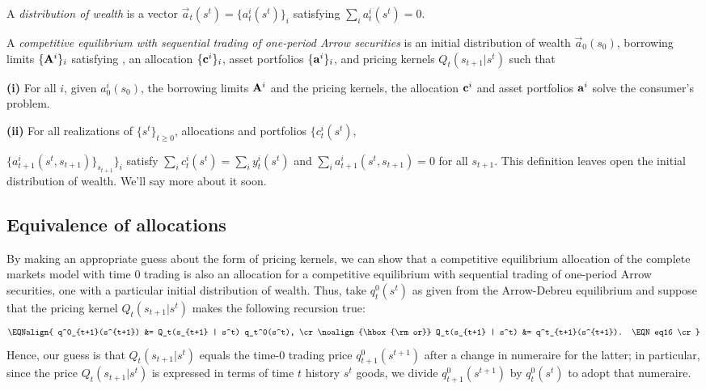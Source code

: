  \medskip
{}  A {\it distribution of wealth} is
a vector $\vec {a}_t(s^t) = \{a_t^i(s^t)\}_i$ satisfying
$\sum_i a_t^i(s^t) = 0$.
\medskip


 A {\it competitive equilibrium with sequential trading of one-period Arrow securities} is
an initial distribution of wealth $\vec { a}_0(s_0)$, 
borrowing limits $\{{\bf A}^i\}_i$ satisfying 
, 
an allocation $\{{\bf c}^i\}_i$, asset portfolios 
$\{{\bf a}^i\}_i$, and pricing
kernels $Q_t(s_{t+1} | s^t)$ such that

\medskip
\noindent
{\bf (i)} For all $i$,
given $ a^i_0(s_0)$, the borrowing 
limits ${\bf A}^i$ and the pricing kernels, 
the allocation ${\bf c}^i$ and asset portfolios
${\bf a}^i$ solve the consumer's problem.

\medskip
\noindent
{\bf (ii)} For all realizations of $\{s^t\}_{t\geq0}$,
allocations and   portfolios
$\{c^i_t(s^t), $

\noindent
$\{a^i_{t+1}(s^t, s_{t+1})\}_{s_{t+1}}\}_i$
satisfy
$\sum_i c^i_t(s^t) = \sum_i y_t^i(s^t)$ and
$\sum_i a_{t+1}^i(s^t, s_{t+1}) = 0$ 
for all $s_{t+1}$.
\medskip
\noindent This definition leaves open the initial
distribution of wealth. We'll say more about it  soon.  %


\subsection{Equivalence of allocations}
By making an appropriate guess about the form of  pricing
kernels, we can show that a competitive equilibrium
allocation of the complete markets model with time $0$ trading is
also an allocation for a competitive equilibrium with sequential trading of one-period
Arrow securities, one
with a particular initial distribution of wealth.  Thus, take
$q_t^0(s^t)$ as given from the Arrow-Debreu equilibrium and
suppose that the pricing kernel $Q_t(s_{t+1} | s^t)$ makes
the following recursion true:
$$\EQNalign{
 q^0_{t+1}(s^{t+1}) &= Q_t(s_{t+1} | s^t) q_t^0(s^t), \cr
\noalign{\hbox{\rm or}}
 Q_t(s_{t+1} | s^t) &= q^t_{t+1}(s^{t+1}).       \EQN eq16 \cr}
$$
Hence, our guess is 
that $Q_t(s_{t+1} | s^t)$ equals
the time-0 trading price $q^0_{t+1}(s^{t+1})$ after
a change in numeraire for the latter; in particular, 
since the price $Q_t(s_{t+1} | s^t)$ 
is expressed in terms of time $t$ history $s^t$ goods,
we divide $q^0_{t+1}(s^{t+1})$ by $q_t^0(s^t)$ to
adopt that  numeraire. 

